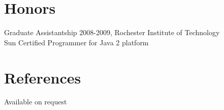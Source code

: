 \documentclass[margin]{res}
\begin{document}
\begin{resume}
\section{Honors}
Graduate Assistantship 2008-2009, Rochester Institute of Technology\\
Sun Certified Programmer for Java 2 platform

\section{References}
Available on request
\end{resume} 
\end{document}
